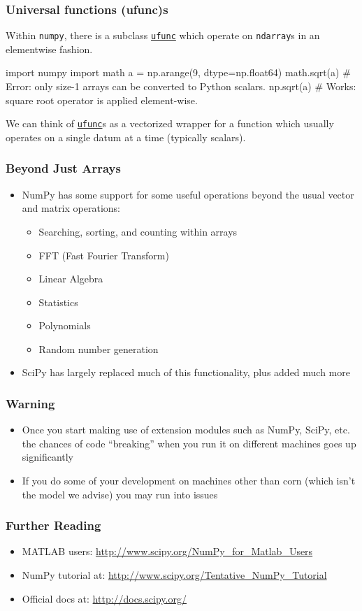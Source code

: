 \documentclass[12pt,letterpaper,twoside]{article}
\begin{document}
\subsubsection{Universal functions (ufunc)s}

Within \texttt{numpy}, there is a subclass
\href{https://docs.scipy.org/doc/numpy-1.15.1/reference/ufuncs.html#universal-functions-ufunc}
{\texttt{ufunc}} which operate on \texttt{ndarray}s in an elementwise fashion.
\begin{python}
import numpy
import math
a = np.arange(9, dtype=np.float64)
math.sqrt(a)   # Error: only size-1 arrays can be converted to Python scalars.
np.sqrt(a)     # Works: square root operator is applied element-wise.
\end{python}

We can think of \href{https://docs.scipy.org/doc/numpy-1.15.1/reference/ufuncs.html#universal-functions-ufunc}{\texttt{ufunc}}s as a vectorized wrapper for a function
which usually operates on a single datum at a time (typically scalars).

\subsubsection{Beyond Just Arrays}
\begin{itemize}
\item
  NumPy has some support for some useful operations beyond the usual
  vector and matrix operations:

  \begin{itemize}
  \item
    Searching, sorting, and counting within arrays
  \item
    FFT (Fast Fourier Transform)
  \item
    Linear Algebra
  \item
    Statistics
  \item
    Polynomials
  \item
    Random number generation
  \end{itemize}
\item
  SciPy has largely replaced much of this functionality, plus added much
  more
\end{itemize}

\subsubsection{Warning}
\begin{itemize}
\item
  Once you start making use of extension modules such as NumPy, SciPy,
  etc. the chances of code ``breaking'' when you run it on different
  machines goes up significantly
\item
  If you do some of your development on machines other than corn (which
  isn't the model we advise) you may run into issues
\end{itemize}

\subsubsection{Further Reading}
\begin{itemize}
\item
  MATLAB users: \url{http://www.scipy.org/NumPy_for_Matlab_Users}
\item
  NumPy tutorial at: \url{http://www.scipy.org/Tentative_NumPy_Tutorial}
\item
  Official docs at: \url{http://docs.scipy.org/}
\end{itemize}
\end{document}

